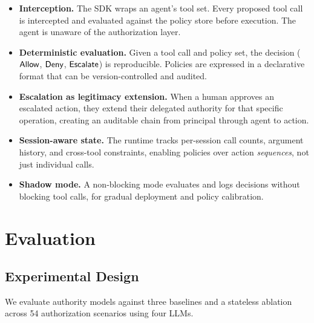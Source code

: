 \documentclass[11pt,a4paper]{article}
\newcommand{\termlabel}[1]{\ifmmode\mathsf{#1}\else{\normalfont\textsc{\MakeLowercase{#1}}}\fi}
\newcommand{\Allow}{\termlabel{Allow}}
\newcommand{\Deny}{\termlabel{Deny}}
\newcommand{\Escalate}{\termlabel{Escalate}}
\begin{document}
\begin{itemize}[leftmargin=1.5em, itemsep=2pt]
  \item \textbf{Interception.} The SDK wraps an agent's tool set. Every proposed tool call is intercepted and evaluated against the policy store before execution. The agent is unaware of the authorization layer.
  \item \textbf{Deterministic evaluation.} Given a tool call and policy set, the decision ($\Allow$, $\Deny$, $\Escalate$) is reproducible. Policies are expressed in a declarative format that can be version-controlled and audited.
  \item \textbf{Escalation as legitimacy extension.} When a human approves an escalated action, they extend their delegated authority for that specific operation, creating an auditable chain from principal through agent to action.
  \item \textbf{Session-aware state.} The runtime tracks per-session call counts, argument history, and cross-tool constraints, enabling policies over action \emph{sequences}, not just individual calls.
  \item \textbf{Shadow mode.} A non-blocking mode evaluates and logs decisions without blocking tool calls, for gradual deployment and policy calibration.
\end{itemize}


\section{Evaluation}
\label{sec:evaluation}

\subsection{Experimental Design}

We evaluate authority models against three baselines and a stateless ablation across 54 authorization scenarios using four LLMs.
\end{document}
